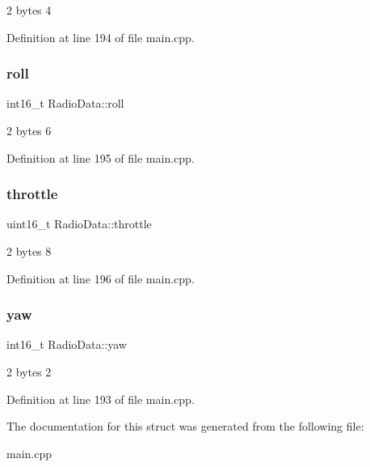 2 bytes 4 



Definition at line 194 of file main.\+cpp.

\mbox{\label{structRadioData_a37f0ff8a110b97904c5e82fd907003ae}} 
\subsubsection{\texorpdfstring{roll}{roll}}
{\footnotesize\ttfamily int16\+\_\+t Radio\+Data\+::roll}



2 bytes 6 



Definition at line 195 of file main.\+cpp.

\mbox{\label{structRadioData_a21c133a1b58627f5386f5652400f0931}} 
\subsubsection{\texorpdfstring{throttle}{throttle}}
{\footnotesize\ttfamily uint16\+\_\+t Radio\+Data\+::throttle}



2 bytes 8 



Definition at line 196 of file main.\+cpp.

\mbox{\label{structRadioData_a241a1c2bfcf77c02542c9f71dfc3f29e}} 
\subsubsection{\texorpdfstring{yaw}{yaw}}
{\footnotesize\ttfamily int16\+\_\+t Radio\+Data\+::yaw}



2 bytes 2 



Definition at line 193 of file main.\+cpp.



The documentation for this struct was generated from the following file\+:\begin{DoxyCompactItemize}
\item 
main.\+cpp\end{DoxyCompactItemize}
